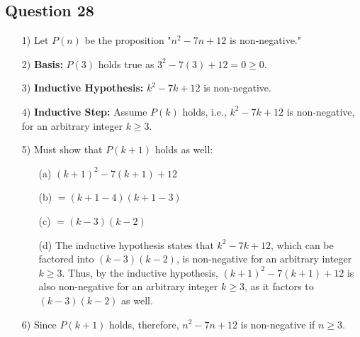\documentclass{article}
\begin{document}
\subsection*{Question 28}
\begin{itemize}
    \item[1)] Let \( P(n) \) be the proposition "\( n^2 - 7n + 12 \) is non-negative."
    \item[2)] \textbf{Basis:} \( P(3) \) holds true as \( 3^2 - 7(3) + 12 = 0 \geq 0 \).
    \item[3)] \textbf{Inductive Hypothesis:} \( k^2 - 7k + 12 \) is non-negative.
    \item[4)] \textbf{Inductive Step:} Assume \( P(k) \) holds, i.e., \( k^2 - 7k + 12 \) is non-negative, for an arbitrary integer \( k \geq 3 \).
    \item[5)] Must show that \( P(k + 1) \) holds as well:
    \begin{enumerate}
        \item[(a)] \( (k + 1)^2 - 7(k + 1) + 12 \)
        \item[(b)] \( = (k + 1 - 4)(k + 1 - 3) \)
        \item[(c)] \( = (k - 3)(k - 2) \)
        \item[(d)] The inductive hypothesis states that \( k^2 - 7k + 12 \), which can be factored into \( (k - 3)(k - 2) \), is non-negative for an arbitrary integer \( k \geq 3 \). Thus, by the inductive hypothesis, \( (k + 1)^2 - 7(k + 1) + 12 \) is also non-negative for an arbitrary integer \( k \geq 3 \), as it factors to \( (k - 3)(k - 2) \) as well.
    \end{enumerate}
    \item[6)] Since \( P(k + 1) \) holds, therefore, \( n^2 - 7n + 12 \) is non-negative if \( n \geq 3 \).
\end{itemize}

\end{document}
